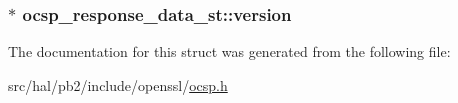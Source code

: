 \subsubsection[{\texorpdfstring{version}{version}}]{$\ast$ ocsp\+\_\+response\+\_\+data\+\_\+st\+::version}\hypertarget{structocsp__response__data__st_ab8d2433650a7535a807f54c97aa03e94}{}\label{structocsp__response__data__st_ab8d2433650a7535a807f54c97aa03e94}


The documentation for this struct was generated from the following file\+:\begin{DoxyCompactItemize}
\item 
src/hal/pb2/include/openssl/\hyperlink{ocsp_8h}{ocsp.\+h}\end{DoxyCompactItemize}
